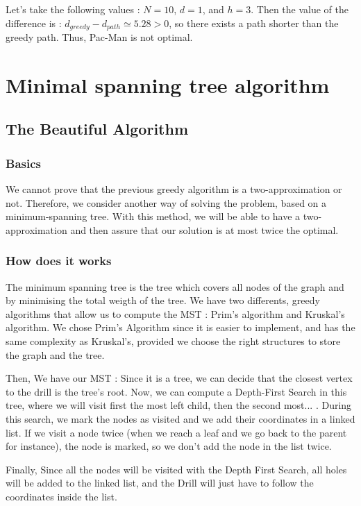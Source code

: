 \documentclass[11pt]{article}
\begin{document}
Let's take the following values : $N = 10$, $d = 1$, and $h = 3$.
Then the value of the difference is : $d_{greedy} - d_{path} \simeq 5.28 > 0$, 
so there exists a path shorter than the greedy path.
Thus, Pac-Man is not optimal.

\section{Minimal spanning tree algorithm}

\subsection{The Beautiful Algorithm}

\subsubsection{Basics}
We cannot prove that the previous greedy algorithm is a two-approximation or not. Therefore, we consider another way of solving the problem, based on a minimum-spanning tree. With this method, we will be able to have a two-approximation and then assure that our solution is at most twice the optimal.
\subsubsection{How does it works}

The minimum spanning tree is the tree which covers all nodes of the graph and by minimising the total weigth of the tree.
We have two differents, greedy algorithms that allow us to compute the MST : Prim's algorithm and Kruskal's algorithm. We chose Prim's Algorithm since it is easier to implement, and has the same complexity as Kruskal's, provided we choose the right structures to store the graph and the tree.

Then, We have our MST : Since it is a tree, we can decide that the closest vertex to the drill is the tree's root.
Now, we can compute a Depth-First Search in this tree, where we will visit first the most left child, then the second most... .
During this search, we mark the nodes as visited and we add their coordinates in a linked list. If we visit a node twice (when we reach a leaf and we go back to the parent for instance), the node is marked, so we don't add the node in the list twice.

Finally, Since all the nodes will be visited with the Depth First Search, all holes will be added to the linked list, and the Drill will just have to follow the coordinates inside the list.
\end{document}
